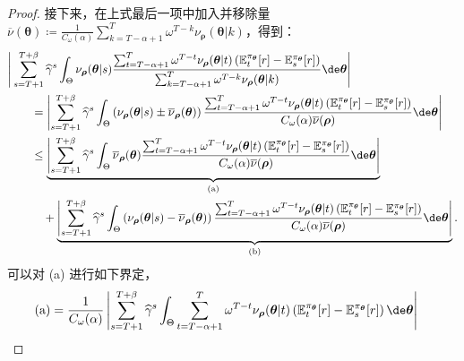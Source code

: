 \begin{proof}
接下来，在上式最后一项中加入并移除量 $\textstyle\overline{\nu}(\boldsymbol\theta) \coloneq \frac{1}{C_{\omega}(\alpha)} \sum_{k=T-\alpha+1}^T \omega^{T-k} \nu_{\boldsymbol\rho}(\boldsymbol\theta|k)$，得到：
\begin{align*}
   &\Bigg| \sum_{s=T+1}^{T+\beta} \widehat{\gamma}^s \int_{\Theta}  \nu_{\boldsymbol\rho}(\boldsymbol\theta|s) \frac{\sum_{t=T-\alpha+1}^T \omega^{T-t} \nu_{\boldsymbol\rho}(\boldsymbol\theta|t) \left(\mathbb{E}_t^{\pi_{\boldsymbol\theta}}[r] - \mathbb{E}_s^{\pi_{\boldsymbol\theta}}[r] \right) }{\sum_{k=T-\alpha+1}^T \omega^{T-k} \nu_{\boldsymbol\rho}(\boldsymbol\theta|k)} \de \boldsymbol\theta  \Bigg|  \\
   &\qquad = \left| \sum_{s=T+1}^{T+\beta} \widehat{\gamma}^s \int_{\Theta}  \left(\nu_{\boldsymbol\rho}(\boldsymbol\theta|s) \pm \overline{\nu}_{\boldsymbol\rho}(\boldsymbol\theta)\right) \frac{\sum_{t=T-\alpha+1}^T \omega^{T-t} \nu_{\boldsymbol\rho}(\boldsymbol\theta|t)  \left(\mathbb{E}_t^{\pi_{\boldsymbol\theta}}[r] - \mathbb{E}_s^{\pi_{\boldsymbol\theta}}[r] \right) }{C_\omega(\alpha) \overline{\nu}(\boldsymbol\rho)} \de \boldsymbol\theta  \right|\\
   &\qquad \le \underbrace{\left| \sum_{s=T+1}^{T+\beta} \widehat{\gamma}^s \int_{\Theta}  \overline{\nu}_{\boldsymbol\rho}(\boldsymbol\theta)  \frac{\sum_{t=T-\alpha+1}^T \omega^{T-t} {\nu}_{\boldsymbol\rho}(\boldsymbol\theta|t) \left(\mathbb{E}_t^{\pi_{\boldsymbol\theta}}[r] - \mathbb{E}_s^{\pi_{\boldsymbol\theta}}[r] \right) }{C_\omega(\alpha) \overline{\nu}(\boldsymbol\rho)} \de \boldsymbol\theta  \right|}_{\text{(a)}} \\
   &\qquad \quad + \underbrace{\left| \sum_{s=T+1}^{T+\beta} \widehat{\gamma}^s \int_{\Theta}  \left(\nu_{\boldsymbol\rho}(\boldsymbol\theta|s) - \overline{\nu}_{\boldsymbol\rho}(\boldsymbol\theta)\right) \frac{\sum_{t=T-\alpha+1}^T \omega^{T-t} \nu_{\boldsymbol\rho}(\boldsymbol\theta|t) \left(\mathbb{E}_t^{\pi_{\boldsymbol\theta}}[r] - \mathbb{E}_s^{\pi_{\boldsymbol\theta}}[r] \right) }{C_\omega(\alpha) \overline{\nu}(\boldsymbol\rho)} \de \boldsymbol\theta  \right|}_{\text{(b)}}.
\end{align*}
可以对 (a) 进行如下界定，
\begin{align}
    \text{(a)} & = \frac{1}{C_\omega(\alpha)} \left| \sum_{s=T+1}^{T+\beta} \widehat{\gamma}^s \int_{\Theta}  \sum_{t=T-\alpha+1}^T \omega^{T-t} {\nu}_{\boldsymbol\rho}(\boldsymbol\theta|t) \left(\mathbb{E}_t^{\pi_{\boldsymbol\theta}}[r] - \mathbb{E}_s^{\pi_{\boldsymbol\theta}}[r] \right) \de \boldsymbol\theta  \right|

\end{align}
\end{proof}
